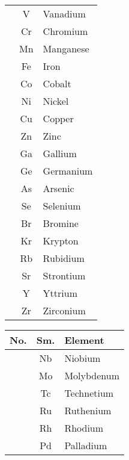 \documentclass{article}
\begin{document}
\begin{table}[h!]
\begin{minipage}{0.33\textwidth}
\begin{tabular}{>{\Rownum}ccl}
			             & V            & Vanadium         \\
			             & Cr           & Chromium         \\
			             & Mn           & Manganese        \\
			             & Fe           & Iron             \\
			             & Co           & Cobalt           \\
			             & Ni           & Nickel           \\
			             & Cu           & Copper           \\
			             & Zn           & Zinc             \\
			             & Ga           & Gallium          \\
			             & Ge           & Germanium        \\
			             & As           & Arsenic          \\
			             & Se           & Selenium         \\
			             & Br           & Bromine          \\
			             & Kr           & Krypton          \\
			             & Rb           & Rubidium         \\
			             & Sr           & Strontium        \\
			             & Y            & Yttrium          \\
			             & Zr           & Zirconium        \\
			\bottomrule
		\end{tabular}
	\end{minipage}%
	\hfill
	\begin{minipage}{0.33\textwidth}
		\centering
		\begin{tabular}{>{\Rownum}ccl}
			\toprule
			\textbf{No.} & \textbf{Sm.} & \textbf{Element} \\
			\midrule
			             & Nb           & Niobium          \\
			             & Mo           & Molybdenum       \\
			             & Tc           & Technetium       \\
			             & Ru           & Ruthenium        \\
			             & Rh           & Rhodium          \\
			             & Pd           & Palladium        \\

\end{tabular}
\end{minipage}
\end{table}
\end{document}
